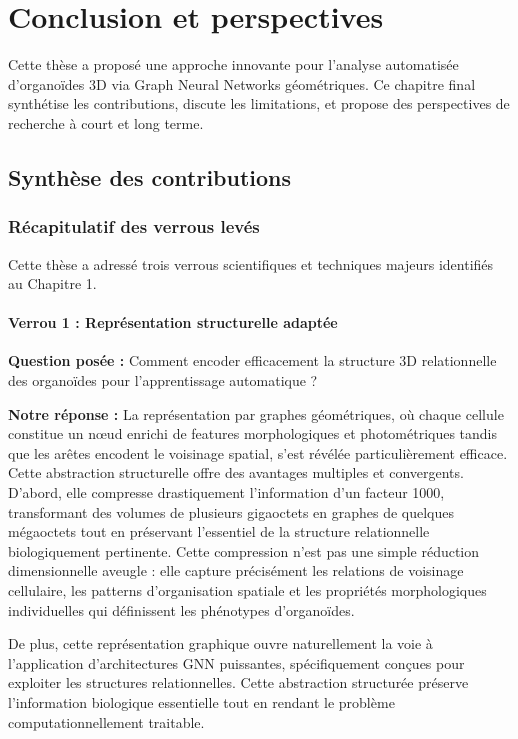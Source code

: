 
\chapter{Conclusion et perspectives}

Cette thèse a proposé une approche innovante pour l'analyse automatisée d'organoïdes 3D via Graph Neural Networks géométriques. Ce chapitre final synthétise les contributions, discute les limitations, et propose des perspectives de recherche à court et long terme.

\section{Synthèse des contributions}

\subsection{Récapitulatif des verrous levés}

Cette thèse a adressé trois verrous scientifiques et techniques majeurs identifiés au Chapitre 1.

\subsubsection{Verrou 1 : Représentation structurelle adaptée}

\textbf{Question posée :} Comment encoder efficacement la structure 3D relationnelle des organoïdes pour l'apprentissage automatique ?

\textbf{Notre réponse :}
La représentation par graphes géométriques, où chaque cellule constitue un nœud enrichi de features morphologiques et photométriques tandis que les arêtes encodent le voisinage spatial, s'est révélée particulièrement efficace. Cette abstraction structurelle offre des avantages multiples et convergents. D'abord, elle compresse drastiquement l'information d'un facteur 1000, transformant des volumes de plusieurs gigaoctets en graphes de quelques mégaoctets tout en préservant l'essentiel de la structure relationnelle biologiquement pertinente. Cette compression n'est pas une simple réduction dimensionnelle aveugle : elle capture précisément les relations de voisinage cellulaire, les patterns d'organisation spatiale et les propriétés morphologiques individuelles qui définissent les phénotypes d'organoïdes. 

De plus, cette représentation graphique ouvre naturellement la voie à l'application d'architectures GNN puissantes, spécifiquement conçues pour exploiter les structures relationnelles. Cette abstraction structurée préserve l'information biologique essentielle tout en rendant le problème computationnellement traitable.


